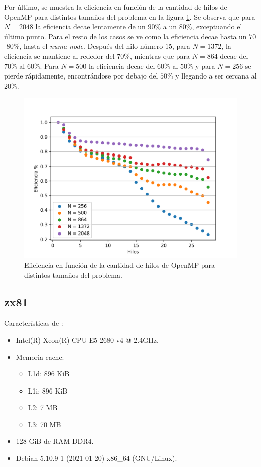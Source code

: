 \documentclass[a4paper,spanish,12pt,twoside]{article}
\begin{document}
Por último, se muestra la eficiencia en función de la cantidad de hilos de OpenMP para distintos tamaños del problema en la figura \ref{fig:omp-eficiencia}. Se observa que para $N = 2048$ la eficiencia decae lentamente de un $90$\% a un $80$\%, exceptuando el último punto. Para el resto de los casos se ve como la eficiencia decae hasta un $70$-$80$\%, hasta el \textit{numa node}. Después del hilo número $15$, para $N = 1372$, la eficiencia se mantiene al rededor del $70$\%, mientras que para $N = 864$ decae del $70$\% al $60$\%. Para $N=500$ la eficiencia decae del $60$\% al $50$\% y para $N=256$ se pierde rápidamente, encontrándose por debajo del $50$\% y llegando a ser cercana al $20$\%.
\begin{figure}[h]
	\centering
	\includegraphics[width=.8\textwidth]{3-omp-eficiencia.png}
	\caption{Eficiencia en función de la cantidad de hilos de OpenMP para distintos tamaños del problema.}\label{fig:omp-eficiencia}
\end{figure}

\clearpage
\pagebreak

\begin{appendices}
	\section{zx81}\label{app:zx81}
	Características de :
	\begin{itemize}
		\item Intel(R) Xeon(R) CPU E5-2680 v4 @ 2.4GHz.
		\item Memoria cache:
		\begin{itemize}
			\item L1d: 896 KiB
			\item L1i: 896 KiB
			\item L2: 7 MB
			\item L3: 70 MB
		\end{itemize}
		\item 128 GiB de RAM DDR4.
		\item Debian 5.10.9-1 (2021-01-20) x86\_64 (GNU/Linux).
	\end{itemize}
\end{appendices}
\end{document}
